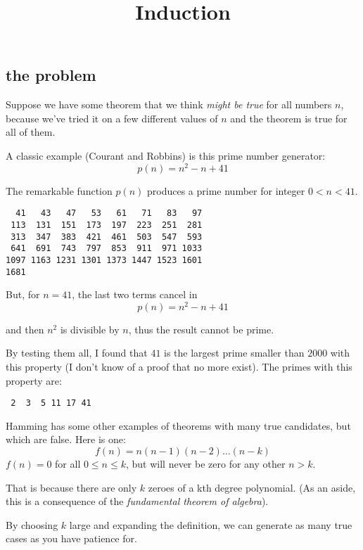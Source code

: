 \documentclass[11pt, oneside]{article}
\title{Induction}
\date{}
\begin{document}
\maketitle
\Large


\label{sec:Induction}

\subsection*{the problem}

Suppose we have some theorem that we think \emph{might be true} for all numbers $n$, because we've tried it on a few different values of $n$ and the theorem is true for all of them.  

A classic example (Courant and Robbins) is this prime number generator:
\[ p(n) = n^2 - n + 41 \]

The remarkable function $p(n)$ produces a prime number for integer $0 < n < 41$.

\begin{verbatim}
  41   43   47   53   61   71   83   97
 113  131  151  173  197  223  251  281
 313  347  383  421  461  503  547  593
 641  691  743  797  853  911  971 1033
1097 1163 1231 1301 1373 1447 1523 1601
1681
\end{verbatim}

But, for $n=41$, the last two terms cancel in
\[ p(n) = n^2 - n + 41 \]

 and then $n^2$ is divisible by $n$, thus the result cannot be prime.

By testing them all, I found that $41$ is the largest prime smaller than $2000$ with this property (I don't know of a proof that no more exist).  The primes with this property are:

\begin{verbatim}
 2  3  5 11 17 41
\end{verbatim}

Hamming has some other examples of theorems with many true candidates, but which are false.  Here is one:
\[ f(n) = n(n-1)(n-2) \dots (n-k) \]
$f(n)=0$ for all $0 \le n \le k$, but will never be zero for any other $n > k$.

That is because there are only $k$ zeroes of a kth degree polynomial.  (As an aside, this is a consequence of the \emph{fundamental theorem of algebra}).

By choosing $k$ large and expanding the definition, we can generate as many true cases as you have patience for.
\end{document}
